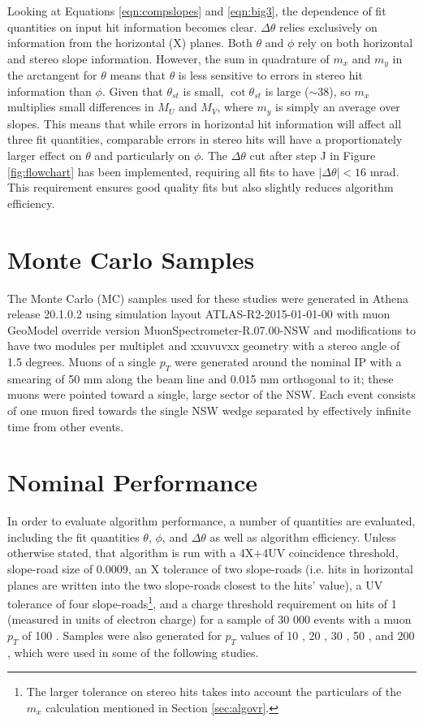 Looking at Equations \ref{eqn:compslopes} and \ref{eqn:big3}, the dependence of fit quantities on input hit information becomes clear.  $\Delta\theta$ relies exclusively on information from the horizontal (X) planes.  Both $\theta$ and $\phi$ rely on both horizontal and stereo slope information.  However, the sum in quadrature of $m_x$ and $m_y$ in the arctangent for $\theta$ means that $\theta$ is less sensitive to errors in stereo hit information than $\phi$.  Given that $\theta_{st}$ is small, $\cot\theta_{st}$ is large ($\sim38$), so $m_x$ multiplies small differences in $M_U$ and $M_V$, where $m_y$ is simply an average over slopes.  This means that while errors in horizontal hit information will affect all three fit quantities, comparable errors in stereo hits will have a proportionately larger effect on $\theta$ and particularly on $\phi$.  The $\Delta\theta$ cut after step J in Figure \ref{fig:flowchart} has been implemented, requiring all fits to have $\left|\Delta\theta\right|<16$ mrad.  This requirement ensures good quality fits but also slightly reduces algorithm efficiency.

\section{Monte Carlo Samples}
\label{sec:mc}
The Monte Carlo (MC) samples used for these studies were generated in Athena release 20.1.0.2 using simulation layout ATLAS-R2-2015-01-01-00 with muon GeoModel override version MuonSpectrometer-R.07.00-NSW and modifications to have two modules per multiplet and xxuvuvxx geometry with a stereo angle of 1.5 degrees.  Muons of a single $p_T$ were generated around the nominal IP with a smearing of 50 mm along the beam line and 0.015 mm orthogonal to it; these muons were pointed toward a single, large sector of the NSW.  Each event consists of one muon fired towards the single NSW wedge separated by effectively infinite time from other events.

\section{Nominal Performance}
\label{sec:nom}
In order to evaluate algorithm performance, a number of quantities are evaluated, including the fit quantities $\theta$, $\phi$, and $\Delta\theta$ as well as algorithm efficiency.  Unless otherwise stated, that algorithm is run with a 4X+4UV coincidence threshold, slope-road size of 0.0009, an X tolerance of two slope-roads (i.e. hits in horizontal planes are written into the two slope-roads closest to the hits' value), a UV tolerance of four slope-roads\footnote{The larger tolerance on stereo hits takes into account the particulars of the $m_x$ calculation mentioned in Section \ref{sec:algovr}.}, and a charge threshold requirement on hits of 1 (measured in units of electron charge) for a sample of 30 000 events with a muon $p_T$ of 100 \GeV.  Samples were also generated for $p_T$ values of 10 \GeV, 20 \GeV, 30 \GeV, 50 \GeV, and 200 \GeV, which were used in some of the following studies.

